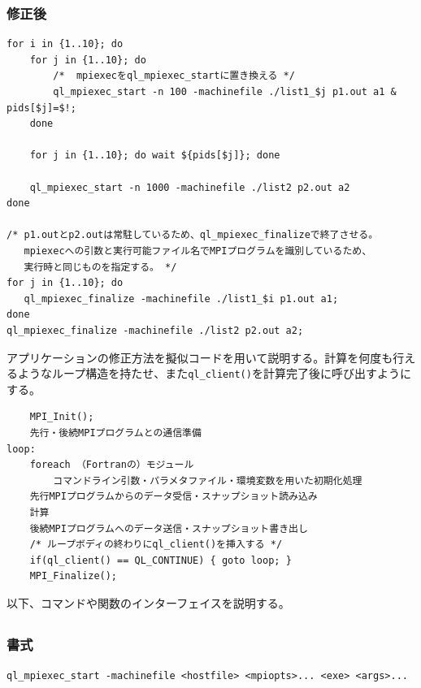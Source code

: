 \documentclass[twoside,11pt,fleqn]{book}
\begin{document}
\subsubsection*{修正後}
\small
\begin{verbatim}
for i in {1..10}; do
    for j in {1..10}; do
        /*  mpiexecをql_mpiexec_startに置き換える */
        ql_mpiexec_start -n 100 -machinefile ./list1_$j p1.out a1 & pids[$j]=$!;
    done

    for j in {1..10}; do wait ${pids[$j]}; done

    ql_mpiexec_start -n 1000 -machinefile ./list2 p2.out a2
done

/* p1.outとp2.outは常駐しているため、ql_mpiexec_finalizeで終了させる。
   mpiexecへの引数と実行可能ファイル名でMPIプログラムを識別しているため、
   実行時と同じものを指定する。 */
for j in {1..10}; do
   ql_mpiexec_finalize -machinefile ./list1_$i p1.out a1;
done
ql_mpiexec_finalize -machinefile ./list2 p2.out a2;
\end{verbatim}
\normalsize

アプリケーションの修正方法を擬似コードを用いて説明する。計算を何度も行えるようなループ構造を持たせ、また\texttt{ql\_client()}を計算完了後に呼び出すようにする。
\small
\begin{verbatim}
    MPI_Init();
    先行・後続MPIプログラムとの通信準備
loop:
    foreach （Fortranの）モジュール
        コマンドライン引数・パラメタファイル・環境変数を用いた初期化処理
    先行MPIプログラムからのデータ受信・スナップショット読み込み
    計算
    後続MPIプログラムへのデータ送信・スナップショット書き出し
    /* ループボディの終わりにql_client()を挿入する */ 
    if(ql_client() == QL_CONTINUE) { goto loop; }
    MPI_Finalize();
\end{verbatim}
\normalsize

以下、コマンドや関数のインターフェイスを説明する。

\subsection{}
\subsubsection*{書式}{\quad} \texttt{ql\_mpiexec\_start -machinefile <hostfile> {\lbrack}<mpiopts>...{\rbrack} <exe> {\lbrack}<args>...{\rbrack}}
\end{document}
